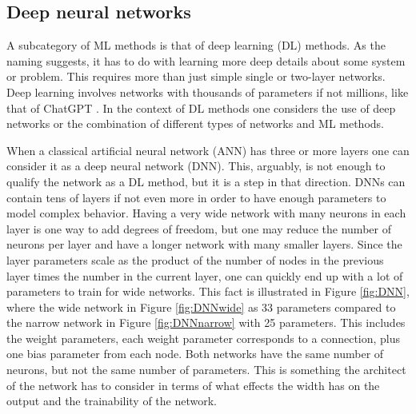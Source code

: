 \documentclass[11pt,a4paper]{article} %
\numberwithin{equation}{section}
\begin{document}
    	\subsection{Deep neural networks}
    	A subcategory of ML methods is that of deep learning (DL) methods. As the naming suggests, it has to do with learning more deep details about some system or problem. This requires more than just simple single or two-layer networks. Deep learning involves networks with thousands of parameters if not millions, like that of ChatGPT \cite{bahrini:2023}. In the context of DL methods one considers the use of deep networks or the combination of different types of networks and ML methods.
    	
    	When a classical artificial neural network (ANN) has three or more layers one can consider it as a deep neural network (DNN). This, arguably, is not enough to qualify the network as a DL method, but it is a step in that direction. DNNs can contain tens of layers if not even more in order to have enough parameters to model complex behavior. Having a very wide network with many neurons in each layer is one way to add degrees of freedom, but one may reduce the number of neurons per layer and have a longer network with many smaller layers. Since the layer parameters scale as the product of the number of nodes in the previous layer times the number in the current layer, one can quickly end up with a lot of parameters to train for wide networks. This fact is illustrated in Figure \ref{fig:DNN}, where the wide network in Figure \ref{fig:DNNwide} as 33 parameters compared to the narrow network in Figure \ref{fig:DNNnarrow} with 25 parameters. This includes the weight parameters, each weight parameter corresponds to a connection, plus one bias parameter from each node. Both networks have the same number of neurons, but not the same number of parameters. This is something the architect of the network has to consider in terms of what effects the width has on the output and the trainability of the network.
    	
\end{document}
